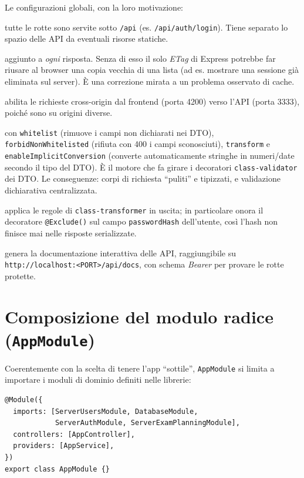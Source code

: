 \documentclass[11pt,a4paper,oneside]{report}
\newcommand{\code}[1]{\texttt{\small #1}}
\newcommand{\file}[1]{\texttt{\small #1}}
\begin{document}
Le configurazioni globali, con la loro motivazione:

\begin{description}[leftmargin=1.6em,style=nextline]
  \item[Prefisso globale \code{/api}] tutte le rotte sono servite sotto
        \code{/api} (es. \code{/api/auth/login}). Tiene separato lo spazio delle
        API da eventuali risorse statiche.
  \item[\code{Cache-Control: no-store}] aggiunto a \emph{ogni} risposta. Senza di
        esso il solo \emph{ETag} di Express potrebbe far riusare al browser una
        copia vecchia di una lista (ad es. mostrare una sessione già eliminata
        sul server). È una correzione mirata a un problema osservato di cache.
  \item[CORS] abilita le richieste cross-origin dal frontend (porta 4200) verso
        l'API (porta 3333), poiché sono su origini diverse.
  \item[\code{ValidationPipe} globale] con \code{whitelist} (rimuove i campi non
        dichiarati nei DTO), \code{forbidNonWhitelisted} (rifiuta con 400 i campi
        sconosciuti), \code{transform} e \code{enableImplicitConversion}
        (converte automaticamente stringhe in numeri/date secondo il tipo del
        DTO). È il motore che fa girare i decoratori \code{class-validator} dei
        DTO. Le conseguenze: corpi di richiesta ``puliti'' e tipizzati, e
        validazione dichiarativa centralizzata.
  \item[\code{ClassSerializerInterceptor}] applica le regole di
        \code{class-transformer} in uscita; in particolare onora il decoratore
        \code{@Exclude()} sul campo \code{passwordHash} dell'utente, così l'hash
        non finisce mai nelle risposte serializzate.
  \item[Swagger] genera la documentazione interattiva delle API, raggiungibile su
        \code{http://localhost:<PORT>/api/docs}, con schema \emph{Bearer} per
        provare le rotte protette.
\end{description}

\section{Composizione del modulo radice (\texttt{AppModule})}
Coerentemente con la scelta di tenere l'app ``sottile'', \code{AppModule} si
limita a importare i moduli di dominio definiti nelle librerie:

\begin{lstlisting}[caption={\file{apps/api/src/app/app.module.ts}.}]
@Module({
  imports: [ServerUsersModule, DatabaseModule,
            ServerAuthModule, ServerExamPlanningModule],
  controllers: [AppController],
  providers: [AppService],
})
export class AppModule {}
\end{lstlisting}
\end{document}
